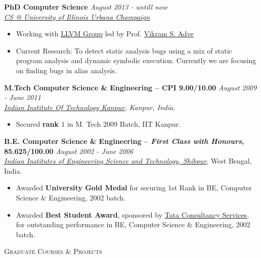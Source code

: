 \documentclass[9pt]{article}
\newenvironment{changemargin}[2]{%
  \begin{list}{}{%
    \setlength{\topsep}{0pt}%
    \setlength{\leftmargin}{#1}%
    \setlength{\rightmargin}{#2}%
    \setlength{\listparindent}{\parindent}%
    \setlength{\itemindent}{\parindent}%
    \setlength{\parsep}{\parskip}%
  }%
  \item[]}{\end{list}
}
\newcommand{\lineover}{
	\begin{changemargin}{-0.05in}{-0.05in}
		\vspace*{-8pt}
		\hrulefill \\
		\vspace*{-2pt}
	\end{changemargin}
}
\newcommand{\header}[1]{
	\begin{changemargin}{-0.5in}{-0.5in}
		\scshape{#1}\\
  	\lineover
	\end{changemargin}
}
\newenvironment{body} {
	\vspace*{-16pt}
	\begin{changemargin}{-0.25in}{-0.5in}
  }	
	{\end{changemargin}
}
\begin{document}
\begin{body}
	\vspace{14pt}
	\textbf{PhD Computer Science }{} \hfill \emph{August 2013 - untill now}{} \\
	\emph{\href{http://cs.illinois.edu/}{CS @ University of Illinois Urbana Champaign}}{} \\
	\begin{itemize} \itemsep -0pt
	  \item  Working with \href{http://llvm.org/}{ LLVM Group} led by Prof. \href{http://web.engr.illinois.edu/~vadve/Home.html}{Vikram S. Adve}
          \item  Current Research: To detect static analysis bugs using a mix of static program analysis and 
                dynamic symbolic execution. Currently we are focusing on finding bugs in alias analysis.
                
        \end{itemize}
 \medskip
	\textbf{M.Tech Computer Science \& Engineering -- CPI 9.00/10.00}{} \hfill \emph{August 2009 - June 2011}{} \\
	\emph{\href{http://www.iitk.ac.in/}{Indian Institute Of Technology Kanpur}, Kanpur, India.}{} \\
	\begin{itemize} \itemsep -0pt
		\item Secured \textbf{rank $1$} in M. Tech 2009 Batch, IIT Kanpur.
	\end{itemize}
  \medskip
	\textbf{B.E. Computer Science \& Engineering -- \emph{First Class with Honours}, 85.625/100.00} \hfill \emph{August 2002 - June 2006} \\
	\emph{\href{http://www.iiests.ac.in/}{Indian Institutes of Engineering Science and Technology, Shibpur}}, West Bengal, India.\\
	\begin{itemize} \itemsep -0pt
		\item Awarded \textbf{University Gold Medal} for securing 1st Rank in BE, Computer Science \& Engineering, 2002 batch.
		\item Awarded \textbf{Best Student Award}, sponsored by \href{http://www.tcs.com}{Tata Consultancy Services}, for outstanding performance in BE, Computer Science \& Engineering, 2002 batch.
	\end{itemize}
\end{body}

\smallskip

\header{Graduate Courses \& Projects}
\end{document}
